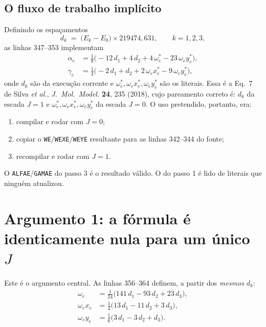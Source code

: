 \documentclass[11pt,a4paper]{article}
\newcommand{\we}{\omega_e}
\newcommand{\wexe}{\omega_e x_e}
\newcommand{\weye}{\omega_e y_e}
\newcommand{\alfae}{\alpha_e}
\newcommand{\gamae}{\gamma_e}
\begin{document}
\subsection{O fluxo de trabalho implícito}

Definindo os espaçamentos
\begin{equation}
  d_k \;=\; \bigl(E_k - E_0\bigr)\times 219474{,}631,
  \qquad k = 1,2,3,
  \label{eq:dk}
\end{equation}
as linhas 347--353 implementam
\begin{align}
  \alfae &= \tfrac{1}{8}\bigl(-12\,d_1 + 4\,d_2 + 4\,\we^{\ast} - 23\,\weye^{\ast}\bigr),
  \label{eq:alfae}\\
  \gamae &= \tfrac{1}{4}\bigl(-2\,d_1 + d_2 + 2\,\wexe^{\ast} - 9\,\weye^{\ast}\bigr),
  \label{eq:gamae}
\end{align}
onde $d_k$ são da execução corrente e $\we^{\ast},\wexe^{\ast},\weye^{\ast}$ são
os literais. Essa é a Eq.~7 de Silva \emph{et al.}, \emph{J.~Mol.~Model.}
\textbf{24}, 235 (2018), cujo pareamento correto é: $d_k$ da escada
\textbf{$J=1$} e $\we^{\ast},\wexe^{\ast},\weye^{\ast}$ da escada
\textbf{$J=0$}. O uso pretendido, portanto, era:

\begin{enumerate}
\item compilar e rodar com $J=0$;
\item copiar o \texttt{WE}/\texttt{WEXE}/\texttt{WEYE} resultante para as linhas
      342--344 do fonte;
\item recompilar e rodar com $J=1$.
\end{enumerate}

\noindent
O \texttt{ALFAE}/\texttt{GAMAE} do passo 3 é o resultado válido. O do passo 1 é
lido de literais que ninguém atualizou.

\section{Argumento 1: a fórmula é identicamente nula para um único $J$}

Este é o argumento central. As linhas 356--364 definem, a partir dos
\emph{mesmos} $d_k$:
\begin{align}
  \we   &= \tfrac{1}{24}\bigl(141\,d_1 - 93\,d_2 + 23\,d_3\bigr), \label{eq:we}\\
  \wexe &= \tfrac{1}{4}\bigl(13\,d_1 - 11\,d_2 + 3\,d_3\bigr),    \label{eq:wexe}\\
  \weye &= \tfrac{1}{6}\bigl(3\,d_1 - 3\,d_2 + d_3\bigr).         \label{eq:weye}
\end{align}
\end{document}
